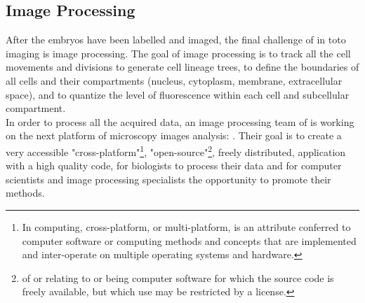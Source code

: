\subsection{Image Processing}

After the embryos have been labelled and imaged, the final challenge of in toto
imaging is image processing. The goal of image processing is to track all the
cell movements and divisions to generate cell lineage trees, to define the
boundaries of all cells and their compartments (nucleus, cytoplasm, membrane,
extracellular space), and to quantize the level of fluorescence within each
cell and subcellular compartment.\\

In order to process all the acquired data, an image processing team of
is working on the next platform of microscopy images analysis: {\gofigure}.
Their goal is to create a very accessible "cross-platform"\footnote{In
computing, cross-platform, or multi-platform, is
an attribute conferred to computer software or computing methods and concepts
that are implemented and inter-operate on multiple operating systems and
hardware.}, "open-source"\footnote{of or
relating to or being computer software for which
the source code is freely available, but which use may be restricted by a
license.}, freely distributed, application with a high quality code, for
biologists to process their data and for computer scientists and image
processing specialists the opportunity to promote their methods.




%
%
%


